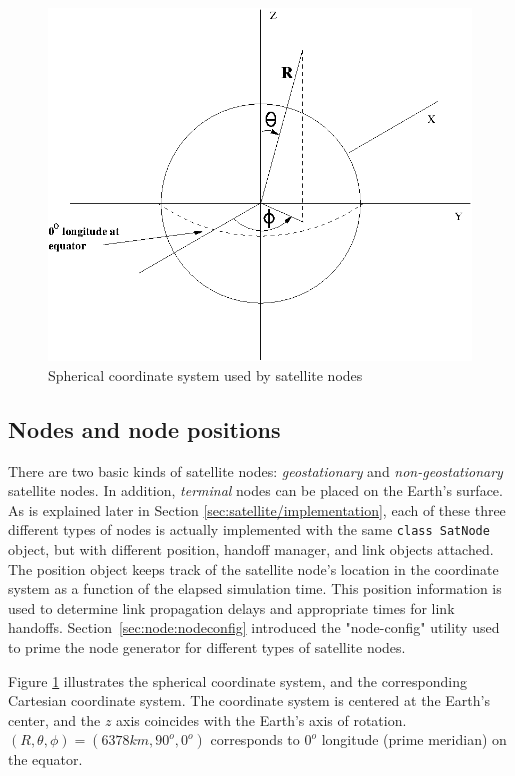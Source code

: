 \begin{figure}
    \centerline{\includegraphics{sat-spherical}}
    \caption{Spherical coordinate system used by satellite nodes}
    \label{fig:spherical}
\end{figure}


\subsection{Nodes and node positions}
\label{sec:satellite/usage/nodes}

There are two basic kinds of satellite nodes:  {\em geostationary}  
and {\em non-geostationary} satellite nodes.  In addition, {\em terminal} nodes
can be placed on the Earth's surface.  As is explained later in 
Section \ref{sec:satellite/implementation},
each of these three different types of nodes is actually implemented with 
the same {\tt class SatNode} object, but with different position,
handoff manager,  and link objects attached.  
The position object keeps track of the satellite node's location 
in the coordinate system as a function of the elapsed simulation time.
This position information is used to determine link propagation delays and
appropriate times for link handoffs.  Section~\ref{sec:node:nodeconfig} 
introduced the 
"node-config" utility used to prime the node generator for different
types of satellite nodes. 

Figure \ref{fig:spherical} illustrates the spherical coordinate system,
and the corresponding Cartesian coordinate system.
The coordinate system is centered at the 
Earth's center, and the $z$ axis coincides with the Earth's axis of rotation.  
$(R,\theta,\phi) = (6378 km, 90^o, 0^o)$ corresponds to $0^o$ longitude 
(prime meridian) on the equator.

